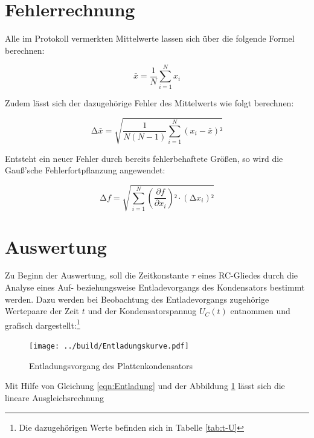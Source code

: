 



\section{Fehlerrechnung}
\label{sec:Fehlerrechnung}

Alle im Protokoll vermerkten Mittelwerte lassen sich über die folgende Formel berechnen:

\begin{equation}
\label{eqn:Mittelwert}
    \bar{x} = \frac{1}{N}\sum_{i=1}^N x_i
\end{equation}

\noindent Zudem lässt sich der dazugehörige Fehler des Mittelwerts wie folgt berechnen:

\begin{equation}
\label{eqn:Mittelwertfehler}
    \increment \bar{x} = \sqrt{\frac{1}{N\left(N-1\right)}\sum_{i=1}^N \left(x_i - \bar{x}\right)²}
\end{equation}

\noindent Entsteht ein neuer Fehler durch bereits fehlerbehaftete Größen, so wird die Gauß'sche Fehlerfortpflanzung angewendet:

\begin{equation}
\label{eqn:Fehlerfortpflanzung}
    \increment f = \sqrt{\sum_{i=1}^N \left(\frac{\partial f}{\partial x_i}\right)²\cdot\left(\increment x_i\right)²}
\end{equation}


\section{Auswertung}
\label{sec:Auswertung}

Zu Beginn der Auswertung, soll die Zeitkonstante $\tau$ eines RC-Gliedes durch die Analyse eines Auf- beziehungsweise Entladevorgangs
des Kondensators bestimmt werden. Dazu werden bei Beobachtung des Entladevorgangs zugehörige Wertepaare der Zeit $t$ und der Kondensatorspannug $U_C(t)$
entnommen und grafisch dargestellt:\footnote{Die dazugehörigen Werte befinden sich in Tabelle \ref{tab:t-U}}

\begin{figure}[H]
    \centering
    \texttt{[image: ../build/Entladungskurve.pdf]}
    \caption{Entladungsvorgang des Plattenkondensators}
    \label{fig:Entladungskurve}
\end{figure}

\noindent Mit Hilfe von Gleichung \eqref{eqn:Entladung} und der Abbildung \ref{fig:Entladungskurve} lässt sich die lineare Ausgleichsrechnung 

